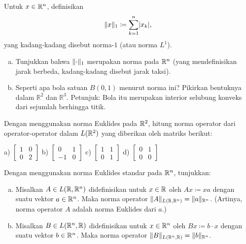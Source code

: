 \begin{exercise}
Untuk $x \in {\mathbb{R}}^n$, definisikan
\begin{equation*}
\lVert {x} \rVert_{1} \coloneqq \sum_{k=1}^n \lvert {x_k} \rvert,
\end{equation*}
yang kadang-kadang disebut norma-$1$ (atau norma $L^1$).
\begin{enumerate}[a)]
\item
Tunjukkan bahwa $\lVert {\cdot} \rVert_1$ merupakan norma pada ${\mathbb{R}}^n$ (yang mendefinisikan
jarak berbeda, kadang-kadang disebut jarak taksi).
\item
Seperti apa bola satuan $B(0,1)$ menurut norma ini?
Pikirkan bentuknya dalam ${\mathbb{R}}^2$ dan $\mathbb{R}^3$.
Petunjuk: Bola itu merupakan interior selubung konveks dari sejumlah berhingga titik.
\end{enumerate}
\end{exercise}

\begin{exercise}
\pagebreak[3]
Dengan menggunakan norma Euklides pada ${\mathbb{R}}^2$, hitung norma operator dari
operator-operator dalam $L({\mathbb{R}}^2)$ yang diberikan oleh matriks berikut:

\medskip
\noindent
a)
$\left[
\begin{smallmatrix}
1 & 0 \\
0 & 2
\end{smallmatrix}
\right]$
\quad
b)
$\left[
\begin{smallmatrix}
0 & 1 \\
-1 & 0
\end{smallmatrix}
\right]$
\quad
c)
$\left[
\begin{smallmatrix}
1 & 1 \\
0 & 1
\end{smallmatrix}
\right]$
\quad
d)
$\left[
\begin{smallmatrix}
0 & 1 \\
0 & 0
\end{smallmatrix}
\right]$
\end{exercise}


\begin{exercise} \label{exercise:normonedim}
\pagebreak[2]
Dengan menggunakan norma Euklides standar pada ${\mathbb{R}}^n$, tunjukkan:
\begin{enumerate}[a)]
\item
Misalkan $A \in L({\mathbb{R}},{\mathbb{R}}^n)$ didefinisikan untuk $x \in {\mathbb{R}}$ oleh $Ax \coloneqq xa$
dengan suatu vektor $a \in {\mathbb{R}}^n$.
Maka norma operator $\lVert {A} \rVert_{L({\mathbb{R}},{\mathbb{R}}^n)} = \lVert {a} \rVert_{{\mathbb{R}}^n}$.
(Artinya, norma operator $A$ adalah norma Euklides dari $a$.)
\item
Misalkan $B \in L({\mathbb{R}}^n,{\mathbb{R}})$ didefinisikan untuk $x \in {\mathbb{R}}^n$ oleh $Bx \coloneqq b \cdot x$
dengan suatu vektor $b \in {\mathbb{R}}^n$.
Maka norma operator $\lVert {B} \rVert_{L({\mathbb{R}}^n,{\mathbb{R}})} = \lVert {b} \rVert_{{\mathbb{R}}^n}$.
\end{enumerate}
\end{exercise}

